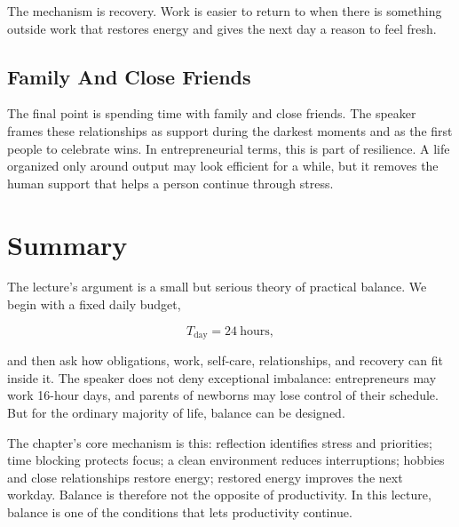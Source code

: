 The mechanism is recovery. Work is easier to return to when there is something outside work that restores energy and gives the next day a reason to feel fresh.

\subsection{Family And Close Friends}

The final point is spending time with family and close friends. The speaker frames these relationships as support during the darkest moments and as the first people to celebrate wins. In entrepreneurial terms, this is part of resilience. A life organized only around output may look efficient for a while, but it removes the human support that helps a person continue through stress.

\section{Summary}

The lecture's argument is a small but serious theory of practical balance. We begin with a fixed daily budget,

\[
T_{\mathrm{day}} = 24\ \mathrm{hours},
\]

and then ask how obligations, work, self-care, relationships, and recovery can fit inside it. The speaker does not deny exceptional imbalance: entrepreneurs may work 16-hour days, and parents of newborns may lose control of their schedule. But for the ordinary majority of life, balance can be designed.

The chapter's core mechanism is this: reflection identifies stress and priorities; time blocking protects focus; a clean environment reduces interruptions; hobbies and close relationships restore energy; restored energy improves the next workday. Balance is therefore not the opposite of productivity. In this lecture, balance is one of the conditions that lets productivity continue.